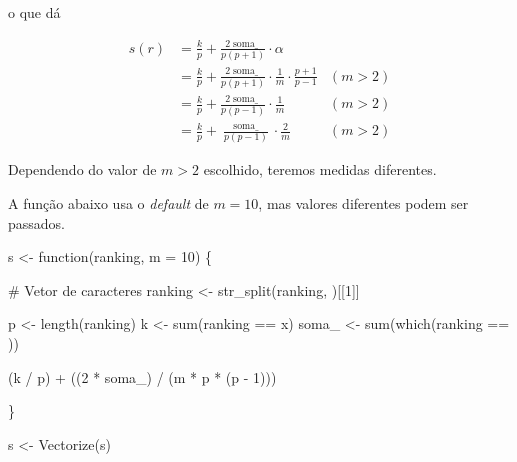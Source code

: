 \documentclass[
  letterpaper,
  DIV=11,
  numbers=noendperiod]{scrreprt}
\newenvironment{Shaded}{\begin{snugshade}}{\end{snugshade}}
\newcommand{\AttributeTok}[1]{\textcolor[rgb]{0.40,0.45,0.13}{#1}}
\newcommand{\CommentTok}[1]{\textcolor[rgb]{0.37,0.37,0.37}{#1}}
\newcommand{\ControlFlowTok}[1]{\textcolor[rgb]{0.00,0.23,0.31}{#1}}
\newcommand{\DecValTok}[1]{\textcolor[rgb]{0.68,0.00,0.00}{#1}}
\newcommand{\FunctionTok}[1]{\textcolor[rgb]{0.28,0.35,0.67}{#1}}
\newcommand{\NormalTok}[1]{\textcolor[rgb]{0.00,0.23,0.31}{#1}}
\newcommand{\OtherTok}[1]{\textcolor[rgb]{0.00,0.23,0.31}{#1}}
\newcommand{\SpecialCharTok}[1]{\textcolor[rgb]{0.37,0.37,0.37}{#1}}
\newcommand{\StringTok}[1]{\textcolor[rgb]{0.13,0.47,0.30}{#1}}
\begin{document}
\begin{itemize}
  o que dá

  \[
  \begin{aligned}
  s(r) 
  &= \frac{k}{p} + \frac{2\operatorname{soma\_}}{p(p+1)} \cdot \alpha \\
  &= \frac{k}{p} + \frac{2\operatorname{soma\_}}{p(p+1)} \cdot 
    \frac1m \cdot \frac{p + 1}{p - 1} & (m > 2) \\
  &= \frac{k}{p} + \frac{2\operatorname{soma\_}}{p(p-1)} \cdot 
    \frac1m & (m > 2) \\
  &= \frac{k}{p} + \frac{\operatorname{soma\_}}{p(p-1)} \cdot 
    \frac2m & (m > 2)
  \end{aligned}
  \]

  Dependendo do valor de $m > 2$ escolhido, teremos medidas diferentes.

  A função abaixo usa o \emph{default} de $m = 10$, mas valores
  diferentes podem ser passados.
\end{itemize}

\begin{Shaded}
\begin{Highlighting}[]
\NormalTok{s }\OtherTok{\textless{}{-}} \ControlFlowTok{function}\NormalTok{(ranking, }\AttributeTok{m =} \DecValTok{10}\NormalTok{) \{}
  
  \CommentTok{\# Vetor de caracteres}
\NormalTok{  ranking }\OtherTok{\textless{}{-}} \FunctionTok{str\_split}\NormalTok{(ranking, }\StringTok{\textquotesingle{}\textquotesingle{}}\NormalTok{)[[}\DecValTok{1}\NormalTok{]]}
  
\NormalTok{  p }\OtherTok{\textless{}{-}} \FunctionTok{length}\NormalTok{(ranking)}
\NormalTok{  k }\OtherTok{\textless{}{-}} \FunctionTok{sum}\NormalTok{(ranking }\SpecialCharTok{==} \StringTok{\textquotesingle{}x\textquotesingle{}}\NormalTok{)}
\NormalTok{  soma\_ }\OtherTok{\textless{}{-}} \FunctionTok{sum}\NormalTok{(}\FunctionTok{which}\NormalTok{(ranking }\SpecialCharTok{==} \StringTok{\textquotesingle{}{-}\textquotesingle{}}\NormalTok{))}

\NormalTok{  (k }\SpecialCharTok{/}\NormalTok{ p) }\SpecialCharTok{+}\NormalTok{ ((}\DecValTok{2} \SpecialCharTok{*}\NormalTok{ soma\_) }\SpecialCharTok{/}\NormalTok{ (m }\SpecialCharTok{*}\NormalTok{ p }\SpecialCharTok{*}\NormalTok{ (p }\SpecialCharTok{{-}} \DecValTok{1}\NormalTok{)))}

\NormalTok{\}}

\NormalTok{s }\OtherTok{\textless{}{-}} \FunctionTok{Vectorize}\NormalTok{(s)}
\end{Highlighting}
\end{Shaded}
\end{document}

